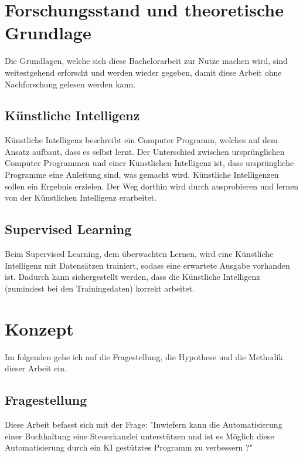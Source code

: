 \documentclass[hidelinks,12pt,a4paper]{article}
\begin{document}
\section{Forschungsstand und theoretische Grundlage}
Die Grundlagen, welche sich diese Bachelorarbeit zur Nutze machen wird, sind weitestgehend erforscht und werden wieder gegeben, damit diese Arbeit ohne Nachforschung gelesen werden kann. 

\subsection{Künstliche Intelligenz}
Künstliche Intelligenz beschreibt ein Computer Programm, welches auf dem Ansatz aufbaut, dass es selbst lernt. Der Unterschied zwischen ursprünglichen Computer Programmen und einer Künstlichen Intelligenz ist, dass ursprüngliche Programme eine Anleitung sind, was gemacht wird. Künstliche Intelligenzen sollen ein Ergebnis erzielen. Der Weg dorthin wird durch ausprobieren und lernen von der Künstlichen Intelligenz erarbeitet. 

\subsection{Supervised Learning}
Beim Supervised Learning, dem überwachten Lernen, wird eine Künstliche Intelligenz mit Datensätzen trainiert, sodass eine erwartete Ausgabe vorhanden ist. Dadurch kann sichergestellt werden, dass die Künstliche Intelligenz (zumindest bei den Trainingsdaten) korrekt arbeitet. 


\section{Konzept}
Im folgenden gehe ich auf die Fragestellung, die Hypothese und die Methodik dieser Arbeit ein. 

\subsection{Fragestellung}
Diese Arbeit befasst sich mit der Frage: "Inwiefern kann die Automatisierung einer Buchhaltung eine Steuerkanzlei unterstützen und ist es Möglich diese Automatisierung durch ein KI gestütztes Programm zu verbessern ?"
\end{document}
